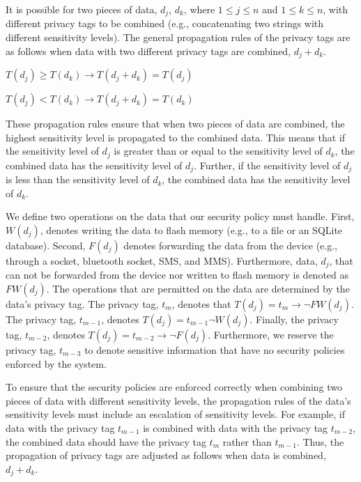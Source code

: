 It is possible for two pieces of data, $d_{j}$, $d_{k}$, where $1 \le
j \le n$ and $1 \le k \le n$,  with different privacy tags
to be combined (e.g., concatenating two strings with different
sensitivity levels).  The general propagation rules of the
privacy tags are as follows when data with two different privacy tags
are combined, $d_{j} + d_{k}$.

$T(d_{j}) \ge T(d_{k}) \to T(d_{j}+d_{k}) = T(d_{j})$

$T(d_{j}) < T(d_{k}) \to T(d_{j}+d_{k}) = T(d_{k})$

These propagation rules ensure that when two pieces of
data are combined, the highest sensitivity level is propagated
to the combined data.   This means that if the sensitivity
level of $d_{j}$ is greater than or equal to the sensitivity
level of $d_{k}$, the combined data has the sensitivity level
of $d_{j}$.  Further, if the sensitivity level of $d_{j}$ is
less than the sensitivity level of $d_{k}$, the combined data
has the sensitivity level of $d_{k}$.

We define two operations on the data that our security policy
must handle.  First, $W(d_{j})$, denotes writing the data to
flash memory (e.g., to a file or an SQLite database). Second,
$F(d_{j})$ denotes forwarding the data from the device
(e.g., through a socket, bluetooth socket, SMS, and MMS).
Furthermore, data, $d_{j}$, that can not be forwarded from the
device nor written to flash memory is denoted as $FW\left(d_{j}\right)$.
The operations that are permitted on the data are determined by the
data's privacy tag.  The privacy tag, $t_{m}$, denotes
that $T(d_{j}) = t_{m} \to \lnot FW\left(d_{j}\right)$. The privacy tag,
$t_{m-1}$, denotes $T(d_{j}) = t_{m-1}\lnot W\left(d_{j}\right)$.  Finally,
the privacy tag, $t_{m-2}$, denotes 
$T(d_{j}) = t_{m-2} \to \lnot F\left(d_{j}\right)$.  Furthermore, we reserve
the privacy tag, $t_{m-3}$ to denote sensitive information that have
no security policies enforced by the system.

To ensure that the security policies are enforced correctly when
combining two pieces of data with different sensitivity levels,
the propagation rules of the data's sensitivity levels must
include an escalation of sensitivity levels.  For example, if
data with the privacy tag $t_{m-1}$ is combined with data with
the privacy tag $t_{m-2}$, the combined data should have the
privacy tag $t_{m}$ rather than $t_{m-1}$.  Thus, the propagation
of privacy tags are adjusted as follows when data is combined,
$d_{j} + d_{k}$.

